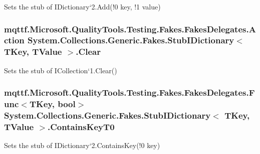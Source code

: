 Sets the stub of I\-Dictionary`2.Add(!0 key, !1 value)

\hypertarget{class_system_1_1_collections_1_1_generic_1_1_fakes_1_1_stub_i_dictionary_3_01_t_key_00_01_t_value_01_4_aa29d12e82c2c4698d0556760ce98de2b}{
\subsubsection[{Clear}]{\setlength{\rightskip}{0pt plus 5cm}mqttf.\-Microsoft.\-Quality\-Tools.\-Testing.\-Fakes.\-Fakes\-Delegates.\-Action System.\-Collections.\-Generic.\-Fakes.\-Stub\-I\-Dictionary$<$ T\-Key, T\-Value $>$.Clear}}\label{class_system_1_1_collections_1_1_generic_1_1_fakes_1_1_stub_i_dictionary_3_01_t_key_00_01_t_value_01_4_aa29d12e82c2c4698d0556760ce98de2b}


Sets the stub of I\-Collection`1.Clear()

\hypertarget{class_system_1_1_collections_1_1_generic_1_1_fakes_1_1_stub_i_dictionary_3_01_t_key_00_01_t_value_01_4_a13089f5d838060ec29a16d3d88f307b0}{
\subsubsection[{Contains\-Key\-T0}]{\setlength{\rightskip}{0pt plus 5cm}mqttf.\-Microsoft.\-Quality\-Tools.\-Testing.\-Fakes.\-Fakes\-Delegates.\-Func$<$T\-Key, bool$>$ System.\-Collections.\-Generic.\-Fakes.\-Stub\-I\-Dictionary$<$ T\-Key, T\-Value $>$.Contains\-Key\-T0}}\label{class_system_1_1_collections_1_1_generic_1_1_fakes_1_1_stub_i_dictionary_3_01_t_key_00_01_t_value_01_4_a13089f5d838060ec29a16d3d88f307b0}


Sets the stub of I\-Dictionary`2.Contains\-Key(!0 key)

